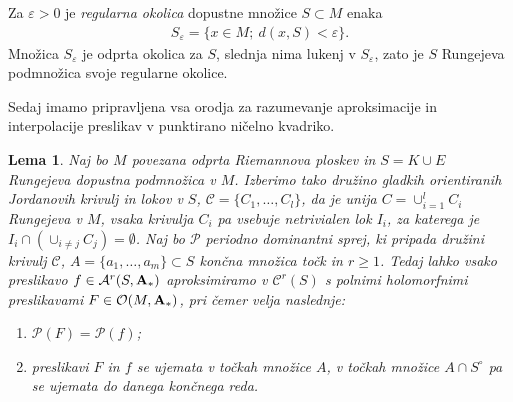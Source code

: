 \documentclass[12pt,a4paper,twoside]{article}
\theoremstyle{definition} %
\theoremstyle{plain} %
\newtheorem{lema}[definicija]{Lema}
\numberwithin{equation}{section}  %
\begin{document}
Za $\varepsilon > 0$ je \emph{regularna okolica} dopustne množice $S \subset M$ enaka
\begin{gather}
S_{\varepsilon} = \{ x \in M; \ d(x,S) < \varepsilon \}.
\end{gather}
Množica $S_{\varepsilon}$ je odprta okolica za $S$, slednja nima lukenj v $S_{\varepsilon}$, zato je $S$ Rungejeva podmnožica svoje regularne okolice.

Sedaj imamo pripravljena vsa orodja za razumevanje aproksimacije in interpolacije preslikav v punktirano ničelno kvadriko.

\begin{lema} \label{lema:aproks&interp-A*}
Naj bo $M$ povezana odprta Riemannova ploskev in $S = K \cup E$ Rungejeva dopustna podmnožica v $M$.
Izberimo tako družino gladkih orientiranih Jordanovih krivulj in lokov v $S$, $\mathcal{C} = \{ C_{1}, \dots , C_{l} \}$, da je unija $C = \cup_{i=1}^{l} C_{i}$ Rungejeva v $M$, vsaka krivulja $C_{i}$ pa vsebuje netrivialen lok $I_{i}$, za katerega je $I_{i} \cap (\cup_{i \neq j} C_{j}) = \emptyset$.
Naj bo $\mathcal{P}$ periodno dominantni sprej, ki pripada družini krivulj $\mathcal{C}$, $A = \{ a_{1}, \dots , a_{m} \} \subset S$ končna množica točk in $r \geq 1$.
Tedaj lahko vsako preslikavo $f \in \mathcal{A}^{r}(S, \textbf{\textup{A}}_{*})$ aproksimiramo v $\mathcal{C}^{r}(S)$ s polnimi holomorfnimi preslikavami $F \in \mathcal{O}(M,\textbf{\textup{A}}_{*})$, pri čemer velja naslednje:
\begin{enumerate}
\item $\mathcal{P}(F) = \mathcal{P}(f)$;
\item preslikavi $F$ in $f$ se ujemata v točkah množice $A$, v točkah množice $A \cap S^{\circ}$ pa se ujemata do danega končnega reda.
\end{enumerate}
\end{lema}
\end{document}

